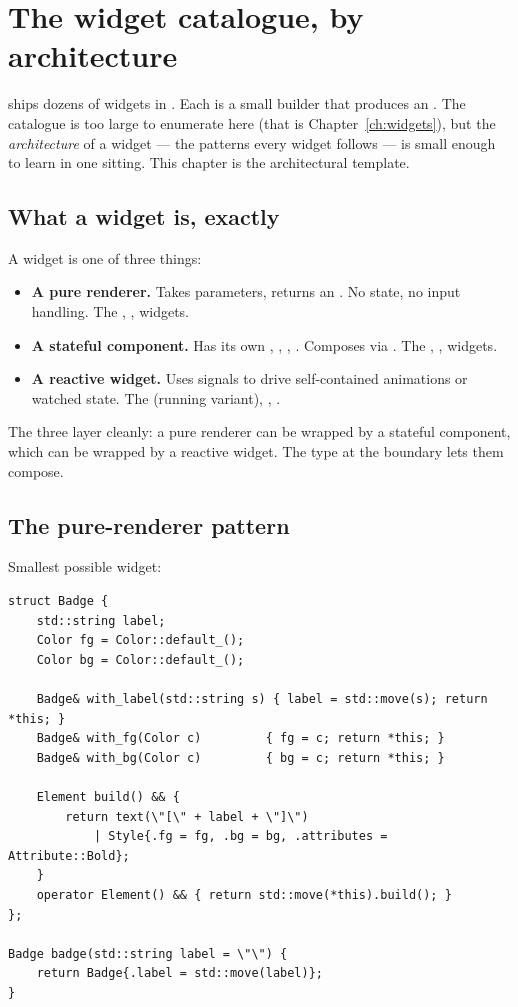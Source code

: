 \chapter{The widget catalogue, by architecture}
\label{ch:widget-arch}

\begin{aside}
\maya{} ships dozens of widgets in .
Each is a small builder that produces an . The
catalogue is too large to enumerate here (that is
Chapter~\ref{ch:widgets}), but the \emph{architecture} of a
widget --- the patterns every widget follows --- is small enough
to learn in one sitting. This chapter is the architectural
template.
\end{aside}

\section{What a widget is, exactly}

A widget is one of three things:

\begin{itemize}[leftmargin=*]
  \item \textbf{A pure renderer.} Takes parameters, returns an
    . No state, no input handling. The
    , ,  widgets.
  \item \textbf{A stateful component.} Has its own ,
    , , . Composes via
    . The , ,
     widgets.
  \item \textbf{A reactive widget.} Uses signals to drive
    self-contained animations or watched state. The
     (running variant), ,
    .
\end{itemize}

The three layer cleanly: a pure renderer can be wrapped by a
stateful component, which can be wrapped by a reactive widget.
The  type at the boundary lets them compose.

\section{The pure-renderer pattern}

Smallest possible widget:

\begin{lstlisting}
struct Badge {
    std::string label;
    Color fg = Color::default_();
    Color bg = Color::default_();

    Badge& with_label(std::string s) { label = std::move(s); return *this; }
    Badge& with_fg(Color c)         { fg = c; return *this; }
    Badge& with_bg(Color c)         { bg = c; return *this; }

    Element build() && {
        return text(\"[\" + label + \"]\")
            | Style{.fg = fg, .bg = bg, .attributes = Attribute::Bold};
    }
    operator Element() && { return std::move(*this).build(); }
};

Badge badge(std::string label = \"\") {
    return Badge{.label = std::move(label)};
}
\end{lstlisting}

